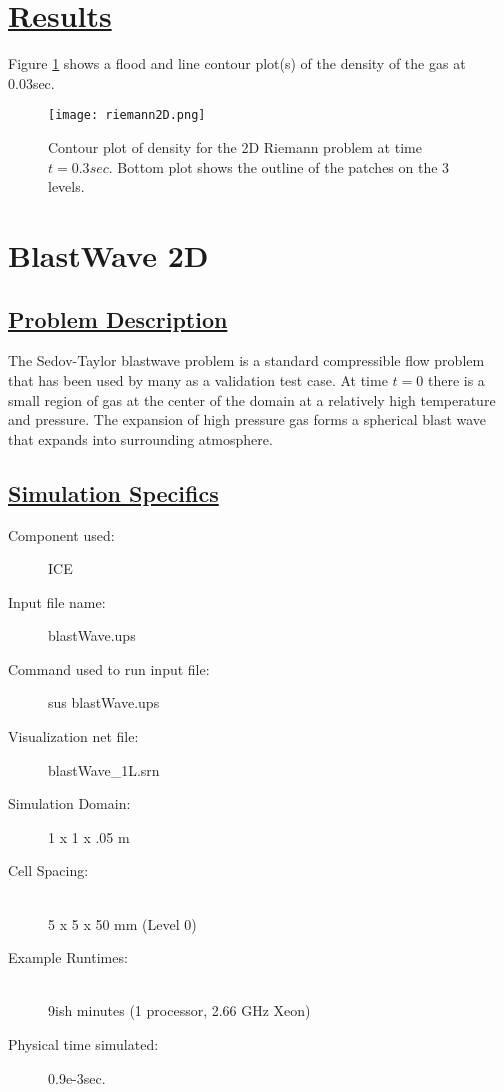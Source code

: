 \section*{\underline{Results}}
Figure \ref{fig:riemann2D} shows a flood and line contour plot(s) of the density of the gas at 0.03sec.
\begin{figure}
  \texttt{[image: riemann2D.png]}
  \caption{Contour plot of density for the 2D Riemann problem at time $t = 0.3sec$.  Bottom plot shows the outline of the patches on the 3 levels.}
  \label{fig:riemann2D}
  \end{figure}
\newpage


\section*{\center BlastWave 2D}
\subsection*{\underline{Problem Description}}
The Sedov-Taylor blastwave problem is a standard compressible flow problem
that has been used by many as a validation test case.  At time $t=0$ there
is a small region of gas at the center of the domain at a relatively high
temperature and pressure.  The expansion of high pressure gas forms a
spherical blast wave that expands into surrounding atmosphere.
\subsection*{\underline{Simulation Specifics}}
\begin{description} 
\item [Component used:] \hfill ICE
\item [Input file name:] \hfill blastWave.ups
\item [Command used to run input file:]\hfill sus blastWave.ups
\item [Visualization net file:]\hfill blastWave\_1L.srn\\


\item [Simulation Domain:]\hfill    1 x 1 x .05 m
\item [Cell Spacing:]\hfill \\ 
5 x 5 x 50 mm (Level 0)


\item [Example Runtimes:] \hfill \\
 9ish minutes   (1 processor, 2.66 GHz Xeon)

\item [Physical time simulated:] \hfill 0.9e-3sec.

\end{description}

